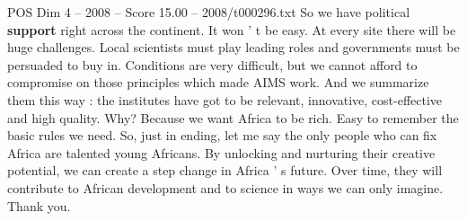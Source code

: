 \begin{textsample}{POS Dim 4 – 2008 – Score 15.00 – 2008/t000296.txt}
So we have political \textbf{support} right across the continent.
It won ' t be easy.
At every site there will be huge challenges.
Local scientists must play leading roles and governments must be persuaded to buy in.
Conditions are very difficult, but we cannot afford to compromise on those principles which made AIMS work.
And we summarize them this way : the institutes have got to be relevant, innovative, cost-effective and high quality.
Why?
Because we want Africa to be rich.
Easy to remember the basic rules we need.
So, just in ending, let me say the only people who can fix Africa are talented young Africans.
By unlocking and nurturing their creative potential, we can create a step change in Africa ' s future.
Over time, they will contribute to African development and to science in ways we can only imagine.
Thank you.

\end{textsample}
